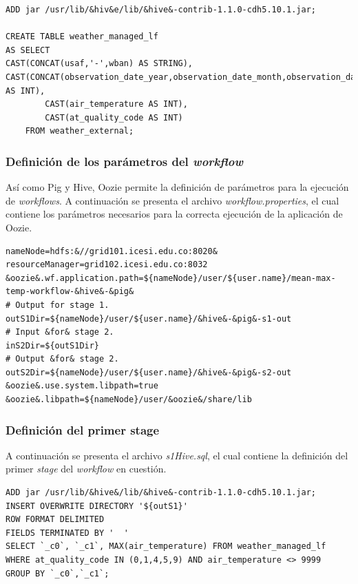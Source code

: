 \begin{lstlisting}[linewidth=\columnwidth,breaklines=true]
ADD jar /usr/lib/&hiv&e/lib/&hive&-contrib-1.1.0-cdh5.10.1.jar;

CREATE TABLE weather_managed_lf
AS SELECT
CAST(CONCAT(usaf,'-',wban) AS STRING),  CAST(CONCAT(observation_date_year,observation_date_month,observation_date_day) AS INT),
        CAST(air_temperature AS INT),
        CAST(at_quality_code AS INT)
    FROM weather_external;
\end{lstlisting}

\subsubsection{Definición de los parámetros del \textit{workflow}} Así como Pig y Hive, Oozie permite la definición de parámetros para la ejecución de \textit{workflows}. A continuación se presenta el archivo \textit{workflow.properties}, el cual contiene los parámetros necesarios para la correcta ejecución de la aplicación de Oozie. 

\begin{lstlisting}[linewidth=\columnwidth,breaklines=true]
nameNode=hdfs:&//grid101.icesi.edu.co:8020&
resourceManager=grid102.icesi.edu.co:8032
&oozie&.wf.application.path=${nameNode}/user/${user.name}/mean-max-temp-workflow-&hive&-&pig&
# Output for stage 1.
outS1Dir=${nameNode}/user/${user.name}/&hive&-&pig&-s1-out
# Input &for& stage 2.
inS2Dir=${outS1Dir}
# Output &for& stage 2.
outS2Dir=${nameNode}/user/${user.name}/&hive&-&pig&-s2-out
&oozie&.use.system.libpath=true
&oozie&.libpath=${nameNode}/user/&oozie&/share/lib
\end{lstlisting}

\subsubsection{Definición del primer stage} A continuación se presenta el archivo \textit{s1Hive.sql}, el cual contiene la definición del primer \textit{stage} del \textit{workflow} en cuestión.

\begin{lstlisting}[linewidth=\columnwidth,breaklines=true]
ADD jar /usr/lib/&hive&/lib/&hive&-contrib-1.1.0-cdh5.10.1.jar;
INSERT OVERWRITE DIRECTORY '${outS1}'
ROW FORMAT DELIMITED
FIELDS TERMINATED BY '	' 	
SELECT `_c0`, `_c1`, MAX(air_temperature) FROM weather_managed_lf 
WHERE at_quality_code IN (0,1,4,5,9) AND air_temperature <> 9999
GROUP BY `_c0`,`_c1`;
\end{lstlisting}

